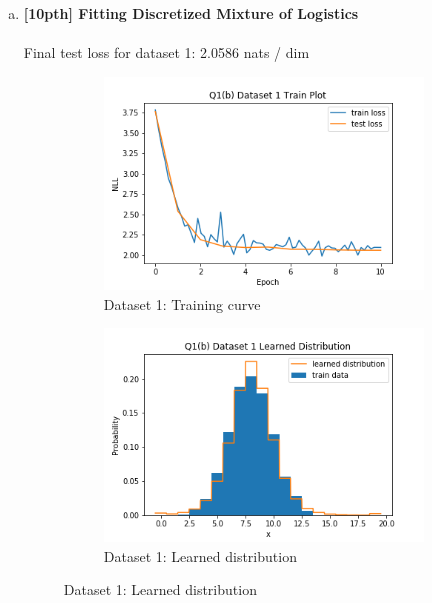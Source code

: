 \documentclass{article}
\begin{document}
\begin{enumerate}[(a)]
\newpage

\item {\bf [10pth] Fitting Discretized Mixture of Logistics} \\\\
Final test loss for dataset 1: 2.0586  nats / dim
\begin{figure}[H]
    \centering
    \begin{subfigure}{0.45\textwidth}
        \centering
        \includegraphics[width=\textwidth]{figures/q1_b_dset1_train_plot.png}
        \caption{Dataset 1: Training curve}
    \end{subfigure}
    \hspace{0.2in}
    \begin{subfigure}{0.45\textwidth}
        \centering
        \includegraphics[width=\textwidth]{figures/q1_b_dset1_learned_dist.png}
        \caption{Dataset 1: Learned distribution}

\end{subfigure}
\end{figure}
\end{enumerate}
\end{document}
